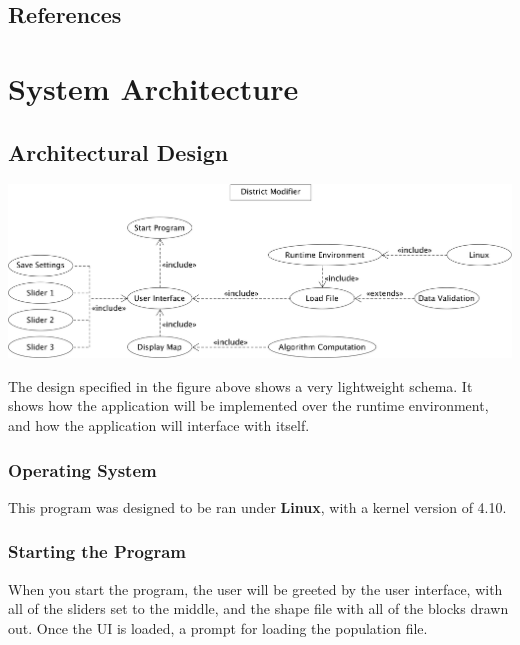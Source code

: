 \documentclass{article}
\begin{document}
\vspace{2.5mm}

\subsection{References}

\vspace{2.5mm}

\section{System Architecture}
\subsection{Architectural Design}

\vspace{2.5mm}
\begin{center}
\includegraphics[scale=.11]{Interface.png}
\end{center}
\vspace{2.5mm}
The design specified in the figure above shows a very lightweight schema. It shows how the application will be implemented over the runtime environment, and how the application will interface with itself.

\vspace{2.5mm}

\subsubsection{Operating System}
This program was designed to be ran under \textbf{Linux}, with a kernel version of 4.10.
\subsubsection{Starting the Program}
When you start the program, the user will be greeted by the user interface, with all of the sliders set to the middle, and the shape file with all of the blocks drawn out. Once the UI is loaded, a prompt for loading the population file.
\end{document}
